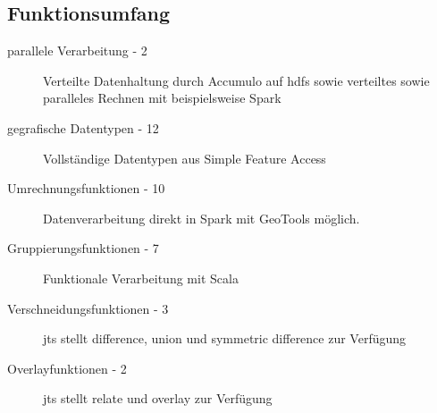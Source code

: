 \subsection{Funktionsumfang}
\begin{description}
\item[parallele Verarbeitung - 2] Verteilte Datenhaltung durch Accumulo auf \Gls{hdfs} sowie verteiltes sowie paralleles Rechnen mit beispielsweise Spark \cite{website:geomesaeclipse}
\item[gegrafische Datentypen - 12] Vollständige Datentypen aus Simple Feature Access \cite{website:geomesaeclipse}
\item[Umrechnungsfunktionen - 10] Datenverarbeitung direkt in Spark mit GeoTools möglich. \cite{website:geotools-crs}
\item[Gruppierungsfunktionen - 7] Funktionale Verarbeitung mit Scala
\item[Verschneidungsfunktionen - 3] \Gls{jts} stellt difference, union und symmetric difference zur Verfügung \cite{website:jts-wikipedia}
\item[Overlayfunktionen - 2] \Gls{jts} stellt relate und overlay zur Verfügung
\end{description} \cite{}




